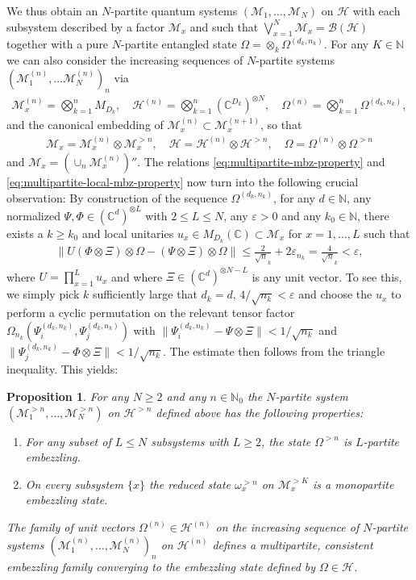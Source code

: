 \documentclass[a4paper, 10pt, onecolumn, accepted=2025-07-22]{quantumarticle}
\newtheorem{proposition}[theorem]{Proposition}
\theoremstyle{definition}
\newcommand{\norm}[1]{\lVert #1\rVert}
\newcommand{\ox}{\otimes}
\newcommand{\mc}{\mathcal}
\newcommand{\eps}{\varepsilon}
\newcommand{\up}[1]{^{(#1)}}
\def\B{{\mc B}}
\def\CC{{\mathbb C}}
\def\H{{\mc H}}
\def\M{{\mc M}}
\def\NN{{\mathbb N}}
\newcommand*{\1}{\text{\usefont{U}{bbold}{m}{n}1}}
\begin{document}
We thus obtain an $N$-partite quantum systems $(\M_{1},\ldots,\M_{N})$ on $\H$ with each subsystem described by a factor $\M_{x}$ and such that $\bigvee_{x=1}^N \M_{x} = \B(\H)$ together with a pure $N$-partite entangled state $\Omega = \otimes_k \Omega^{(d_k,n_k)}$. 
For any $K\in\NN$ we can also consider the increasing sequences of $N$-partite systems $(\M\up{n}_1,\ldots \M\up{n}_N)_n$ via
    \begin{align}
      \M_{x}\up{n} = \bigotimes_{k=1}^n M_{D_k},\quad \H\up{n} = \bigotimes_{k=1}^n (\CC^{D_k})^{\otimes N},\quad  \Omega\up{n} = \bigotimes_{k=1}^n \Omega^{(d_k,n_k)}, 
    \end{align}
and the canonical embedding of $\M\up{n}_x\subset \M\up{n+1}_x$, so that
\begin{align}
    \M_{x} = \M_{x}\up{n} \ox \M_{x}^{>n},\quad \H = \H\up{n}\ox \H^{>n},\quad \Omega = \Omega\up{n}\ox \Omega^{>n}
\end{align}
and $\M_x = (\cup_n \M\up{n}_x)''$. 
The relations \eqref{eq:multipartite-mbz-property} and \eqref{eq:multipartite-local-mbz-property} now turn into the following crucial observation:
By construction of the sequence $\Omega^{(d_k,n_k)}$, for any $d\in\NN$, any normalized $\Psi,\Phi \in (\CC^{d})^{\otimes L}$ with $2\leq L\leq N$, any $\eps>0$ and any $k_0\in \NN$, there exists a $k\geq k_0$ and local unitaries $u_x \in M_{D_k}(\CC)\subset \M_{x}$  for $x=1,\ldots,L$ such that
\begin{align}
    \norm{U (\Phi\ox \Xi) \ox \Omega - (\Psi\ox \Xi) \ox \Omega} \leq \frac{2}{\sqrt n_k} + 2\varepsilon_{n_k} = \frac{4}{\sqrt n_k}<\varepsilon,
\end{align}
where $U=\prod_{x=1}^L u_x$ and where $\Xi\in(\CC^{d})^{\ox N-L}$ is any unit vector. To see this, we simply pick $k$ sufficiently large that $d_k=d$, $4/\sqrt{n_k}<\varepsilon$ and choose the $u_x$ to  perform a cyclic permutation on the relevant tensor factor $\Omega_{n_k}(\Psi_i^{(d_k,n_k)},\Psi_j^{(d_k,n_k)})$ with $\norm{\Psi_i^{(d_k,n_k)}-\Psi\ox\Xi}<1/\sqrt{n_k}$ and $\norm{\Psi_j^{(d_k,n_k)}-\Phi\ox\Xi}<1/\sqrt{n_k}$. The estimate then follows from the triangle inequality.
This yields:

\begin{proposition}
    For any $N\geq 2$ and any $n\in\NN_0$ the $N$-partite system $(\M_{1}^{>n},\ldots,\M_{N}^{>n})$ on $\H^{>n}$ defined above has the following properties:
    \begin{enumerate}
    \item For any subset of $L\leq N$ subsystems with $L\geq 2$, the state $\Omega^{>n}$ is $L$-partite embezzling. 
    \item On every subsystem $\{x\}$ the reduced state $\omega_x^{>n}$ on $\M_{x}^{>K}$ is a monopartite embezzling state.  
 \end{enumerate}
  The family of unit vectors $\Omega\up{n}\in\H\up{n}$ on the increasing sequence of $N$-partite systems $(\M_1\up{n},\ldots, \allowbreak \M_N\up{n})_n$ on $\H\up{n}$ defines a multipartite, consistent embezzling family converging to the embezzling state defined by $\Omega\in\H$. 
\end{proposition}
\end{document}
